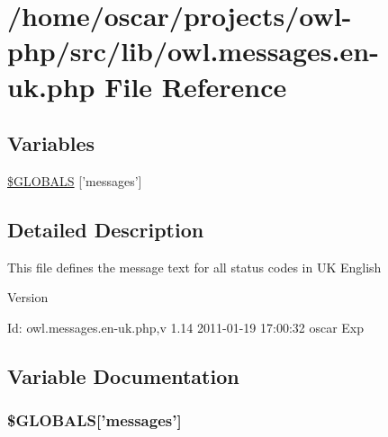 \section{/home/oscar/projects/owl-\/php/src/lib/owl.messages.en-\/uk.php File Reference}
\label{owl_8messages_8en-uk_8php}
\subsection*{Variables}
\begin{DoxyCompactItemize}
\item 
\hyperlink{owl_8messages_8en-uk_8php_a65f2996116eed36e9ab25f254a470259}{\$GLOBALS} \mbox{[}'messages'\mbox{]}
\end{DoxyCompactItemize}


\subsection{Detailed Description}
This file defines the message text for all status codes in UK English \begin{DoxyVersion}{Version}

\end{DoxyVersion}
\begin{DoxyParagraph}{Id:}
owl.messages.en-\/uk.php,v 1.14 2011-\/01-\/19 17:00:32 oscar Exp 
\end{DoxyParagraph}


\subsection{Variable Documentation}
\subsubsection[{\$GLOBALS}]{\setlength{\rightskip}{0pt plus 5cm}\$GLOBALS\mbox{[}'messages'\mbox{]}}\label{owl_8messages_8en-uk_8php_a65f2996116eed36e9ab25f254a470259}
